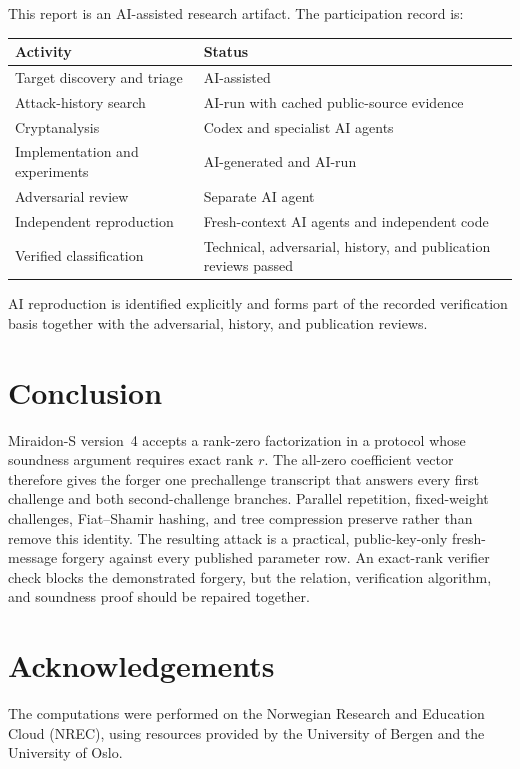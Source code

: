 \documentclass[10pt,a4paper]{article}
\begin{document}
This report is an AI-assisted research artifact.  The participation record
is:
\begin{center}
\small
\begin{tabular}{@{}p{}p{}@{}}
\toprule
Activity & Status \\
\midrule
Target discovery and triage & AI-assisted \\
Attack-history search & AI-run with cached public-source evidence \\
Cryptanalysis & Codex and specialist AI agents \\
Implementation and experiments & AI-generated and AI-run \\
Adversarial review & Separate AI agent \\
Independent reproduction & Fresh-context AI agents and independent code \\
Verified classification & Technical, adversarial, history, and publication reviews passed \\
\bottomrule
\end{tabular}
\end{center}
AI reproduction is identified explicitly and forms part of the recorded
verification basis together with the adversarial, history, and publication
reviews.

\section{Conclusion}

Miraidon-S version~4 accepts a rank-zero factorization in a protocol whose
soundness argument requires exact rank $r$.  The all-zero coefficient vector
therefore gives the forger one prechallenge transcript that answers every
first challenge and both second-challenge branches.  Parallel repetition,
fixed-weight challenges, Fiat--Shamir hashing, and tree compression preserve
rather than remove this identity.  The resulting attack is a practical,
public-key-only fresh-message forgery against every published parameter row.
An exact-rank verifier check blocks the demonstrated forgery, but the relation,
verification algorithm, and soundness proof should be repaired together.

\section*{Acknowledgements}

The computations were performed on the Norwegian Research and Education Cloud (NREC), using resources provided by the University of Bergen and the University of Oslo.
\end{document}
